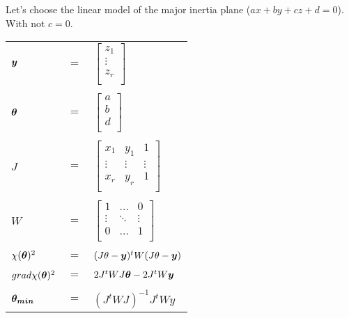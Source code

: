\documentclass{article}
\newcommand{\bm}[1]{\mbox{\boldmath$#1$}}
\begin{document}
Let's choose the linear model of the major inertia plane 
($ax + by + cz + d = 0$). With not $c = 0$.

\begin{tabular}{lcl}
$\bm{y}$ & $=$ & 
$\left[\begin{array}{c}
 z_1 \\
 \vdots \\
 z_r \\
\end{array}\right]$
\\
\\
$\bm{\theta}$ & $=$ &
$\left[\begin{array}{c}
 a \\
 b \\
 d \\
\end{array}\right]$
\\
\\
$J$ & $=$ &
$\left[\begin{array}{ccc}
 x_1    & y_1    & 1 \\
 \vdots & \vdots & \vdots\\
 x_r    & y_r    & 1\\
\end{array}\right]$
\\
\\
$W$ & $=$ &
$\left[\begin{array}{ccc}
 1      & \ldots & 0 \\
 \vdots & \ddots & \vdots\\
 0      & \ldots & 1\\
\end{array}\right]$
\\
\\
$\chi(\bm{\theta})^2$ & $=$ &
$(J\theta - \bm{y})^t W (J\theta - \bm{y})$
\\
\\
$grad \chi(\bm{\theta})^2$ & $=$ &
$2J^tWJ\bm{\theta} - 2J^tW\bm{y}$
\\
\\
$\bm{\theta_{min}}$ & $=$ &
$(J^tWJ)^{-1} J^tWy$
\end{tabular}
\end{document}
